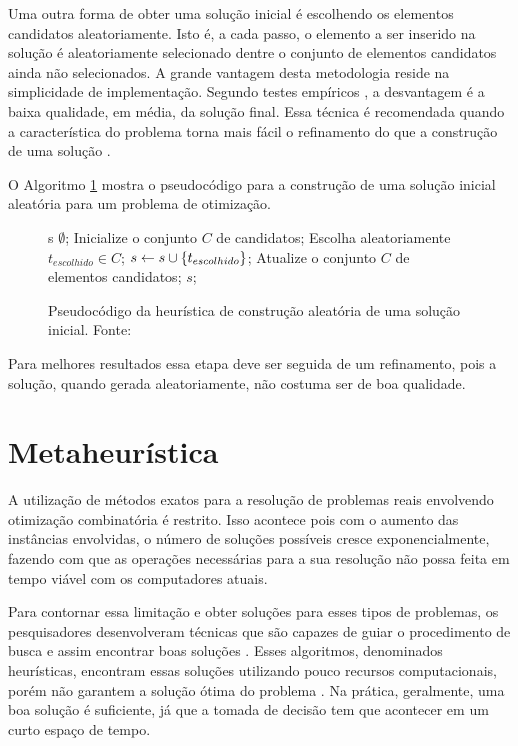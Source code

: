 Uma outra forma de obter uma solução inicial é escolhendo os elementos candidatos aleatoriamente. Isto é, a cada passo, o elemento a ser inserido na solução é aleatoriamente selecionado dentre o conjunto de elementos candidatos ainda não selecionados. A grande vantagem desta metodologia reside na simplicidade de implementação. Segundo testes empíricos , a desvantagem é a baixa qualidade, em média, da solução final. Essa técnica é recomendada quando a característica do problema torna mais fácil o refinamento do que a construção de uma solução \citep{notasmarcone}. 

O Algoritmo \ref{alg:heurconsaleatoria} mostra o pseudocódigo para a construção de uma solução inicial aleatória para um problema de otimização.

\begin{figure}[h]
\caption{Pseudocódigo da heurística de construção aleatória de uma
solução inicial. \mbox{Fonte: \cite{notasmarcone}}}\label{alg:heurconsaleatoria}
\begin{programma}
\STATE s \GETS $\emptyset$;
\STATE Inicialize o conjunto $C$ de candidatos;
\STATE Escolha aleatoriamente $t_{escolhido} \in C$;
\STATE $s \leftarrow s \cup \{t_{escolhido}\}$;
\STATE Atualize o conjunto $C$ de elementos candidatos;
\ENDWHILE
\STATE\RETURN $s$;
\ENDALGORITHM
\end{programma}
\end{figure}

Para melhores resultados essa etapa deve ser seguida de um refinamento, pois a solução, quando gerada aleatoriamente, não costuma ser de boa qualidade.

\section{Metaheurística}

A utilização de métodos exatos para a resolução de problemas reais envolvendo otimização combinatória é restrito. Isso acontece pois com o aumento das instâncias envolvidas, o número de soluções possíveis cresce exponencialmente, fazendo com que as operações necessárias para a sua resolução não possa feita em tempo viável com os computadores atuais.  

Para contornar essa limitação e obter soluções para esses tipos de problemas, os pesquisadores desenvolveram técnicas que são capazes de guiar o procedimento de busca e assim encontrar boas soluções \cite{maritan2009}. Esses algoritmos, denominados heurísticas, encontram essas soluções utilizando pouco recursos computacionais, porém não garantem a solução ótima do problema \cite{dias2006}. Na prática, geralmente, uma boa solução é suficiente, já que a tomada de decisão tem que acontecer em um curto espaço de tempo.

